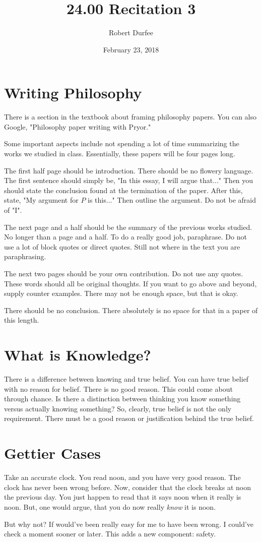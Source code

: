 \documentclass{article}
\title{ 24.00 Recitation 3 }
\author{ Robert Durfee }
\date{ February 23, 2018 }
\begin{document}
\maketitle

\section{ Writing Philosophy }

There is a section in the textbook about framing philosophy papers. You can also
Google, "Philosophy paper writing with Pryor."

Some important aspects include not spending a lot of time summarizing the works
we studied in class. Essentially, these papers will be four pages long.

The first half page should be introduction. There should be no flowery language.
The first sentence should simply be, "In this essay, I will argue that..." Then
you should state the conclusion found at the termination of the paper. After
this, state, "My argument for $P$ is this..." Then outline the argument. Do not
be afraid of "I".

The next page and a half should be the summary of the previous works studied. No
longer than a page and a half. To do a really good job, paraphrase. Do not use a
lot of block quotes or direct quotes. Still not where in the text you are
paraphrasing.

The next two pages should be your own contribution. Do not use any quotes. These
words should all be original thoughts. If you want to go above and beyond,
supply counter examples. There may not be enough space, but that is okay.

There should be no conclusion. There absolutely is no space for that in a paper
of this length.

\section{What is Knowledge?}

There is a difference between knowing and true belief. You can have true belief
with no reason for belief. There is no good reason. This could come about
through chance. Is there a distinction between thinking you know something
versus actually knowing something? So, clearly, true belief is not the only
requirement. There must be a good reason or justification behind the true
belief.

\section{Gettier Cases}

Take an accurate clock. You read noon, and you have very good reason. The clock
has never been wrong before. Now, consider that the clock breaks at noon the
previous day. You just happen to read that it says noon when it really is noon.
But, one would argue, that you do now really \textit{know} it is noon.

But why not? If would've been really easy for me to have been wrong. I could've
check a moment sooner or later. This adds a new component: safety.
\end{document}
